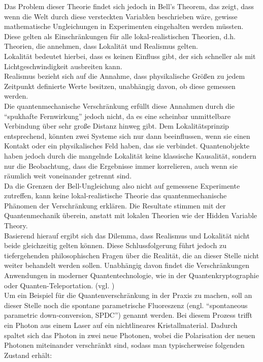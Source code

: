 Das Problem dieser Theorie findet sich jedoch in Bell's Theorem, das zeigt, dass wenn die Welt durch diese versteckten Variablen beschrieben wäre, gewisse mathematische Ungleichungen in Experimenten eingehalten werden müssten. 
Diese gelten als Einschränkungen für alle lokal-realistischen Theorien, d.h. Theorien, die annehmen, dass Lokalität und Realismus gelten. \\ 
Lokalität bedeutet hierbei, dass es keinen Einfluss gibt, der sich schneller als mit Lichtgeschwindigkeit ausbreiten kann. \\
Realismus bezieht sich auf die Annahme, dass physikalische Größen zu jedem Zeitpunkt definierte Werte besitzen, unabhängig davon, ob diese gemessen werden. \\

Die quantenmechanische Verschränkung erfüllt diese Annahmen durch die ``spukhafte Fernwirkung'' jedoch nicht, da es eine scheinbar unmittelbare Verbindung über sehr große Distanz hinweg gibt. Dem Lokalitätsprinzip entsprechend, könnten zwei Systeme sich nur dann beeinflussen, wenn sie einen Kontakt oder ein physikalisches Feld haben, das sie verbindet. Quantenobjekte haben jedoch durch die mangelnde Lokalität keine klassische Kausalität, sondern nur die Beobachtung, dass die Ergebnisse immer korrelieren, auch wenn sie räumlich weit voneinander getrennt sind.
\\ 

Da die Grenzen der Bell-Ungleichung also nicht auf gemessene Experimente zutreffen, kann keine lokal-realistische Theorie das quantenmechanische Phänomen der Verschränkung erklären. Die Resultate stimmen mit der Quantenmechanik überein, anstatt mit lokalen Theorien wie der Hidden Variable Theory. 
\\ 

Basierend hierauf ergibt sich das Dilemma, dass Realismus und Lokalität nicht beide gleichzeitig gelten können. Diese Schlussfolgerung führt jedoch zu tiefergehenden philosophischen Fragen über die Realität, die an dieser Stelle nicht weiter behandelt werden sollen. Unabhängig davon findet die Verschränkungen Anwendungen in moderner Quantentechnologie, wie in der Quantenkryptographie oder Quanten-Teleportation.  
(vgl. \cite[Ch. 2.11]{homeister_quantum_2022-1})
\\

Um ein Beispiel für die Quantenverschränkung in der Praxis zu machen, soll an dieser Stelle noch  die spontane parametrische Fluoreszenz (engl. ``spontaneous parametric down-conversion, SPDC'') genannt werden. Bei diesem Prozess trifft ein Photon aus einem Laser auf ein nichtlineares Kristallmaterial. Dadurch spaltet sich das Photon in zwei neue Photonen, wobei die Polarisation der neuen Photonen miteinander verschränkt sind, sodass man typischerweise folgenden Zustand erhält:

